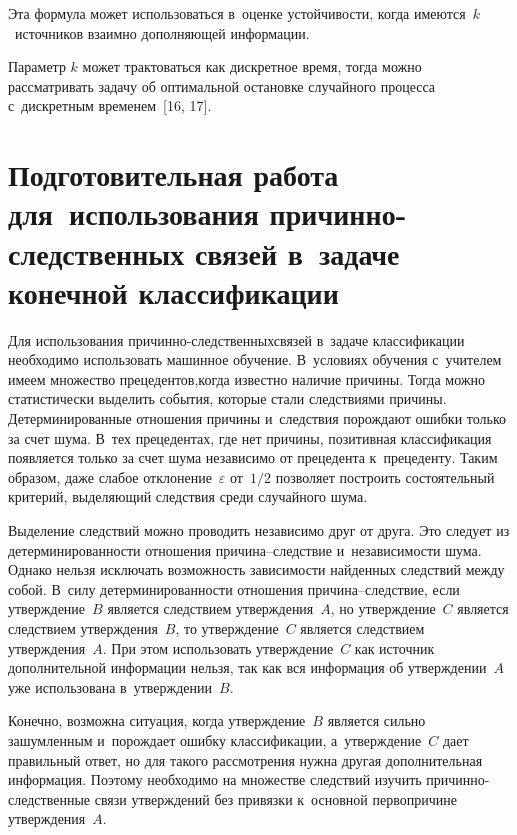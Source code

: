 \begin{multicols}{2}
\vspace*{-4pt}
  
  Эта формула может использоваться в~оценке устойчивости, когда 
имеются~$k$~источников взаимно дополняющей информации.
  
  Параметр $k$ может трактоваться как дискретное время, тогда можно 
рассматривать задачу об оптимальной остановке случайного процесса 
с~дискретным временем~[16, 17].

\vspace*{-3pt}
  
\section{Подготовительная работа для~использования 
причинно-следственных связей в~задаче конечной классификации }

\vspace*{-3pt}

   Для использования причинно-следственных\linebreak связей в~задаче классификации 
необходимо использовать машинное обуче\-ние. В~условиях обуче\-ния с~учителем 
имеем множество прецедентов,\linebreak когда известно наличие причины. Тогда можно 
статистически выделить события, которые стали следствиями причины. 
Детерминированные отношения причины и~следствия порождают ошибки \mbox{только} 
за счет шума. В~тех прецедентах, где нет причины, позитивная классификация 
появляется только за счет шума независимо от прецедента к~прецеденту. Таким 
образом, даже слабое отклонение~$\varepsilon$ от~$1/2$ позволяет построить 
состоятельный критерий, выделяющий следствия среди случайного шума. 
  
  Выделение следствий можно проводить независимо друг от друга. Это следует 
из детерминированности отношения при\-чи\-на--след\-ст\-вие и~независимости 
шума. Однако нельзя исключать \mbox{возможность} зависимости найденных следствий 
между собой. В~силу детерминированности отношения при\-чи\-на--след\-ст\-вие, 
если утверждение~$B$ является следствием утверждения~$A$, но 
утверждение~$C$ является следствием утверждения~$B$, то утверждение~$C$ 
является следствием утверждения~$A$. При этом использовать утверждение~$C$ 
как источник дополнительной информации нельзя, так как вся информация об 
утверждении~$A$ уже использована в~утверждении~$B$. 
  
  Конечно, возможна ситуация, когда утверждение~$B$ является сильно 
зашумленным и~по\-рож\-да\-ет ошибку классификации, а~утверж\-де\-ние~$C$ дает 
правильный ответ, но для такого рассмотрения нужна другая дополнительная 
информация. Поэтому необходимо на множестве следствий 
\mbox{изучить} при\-чин\-но-след\-ст\-вен\-ные связи утверждений без привязки к~основной первопричине 
утверждения~$A$.
  

\end{multicols}
